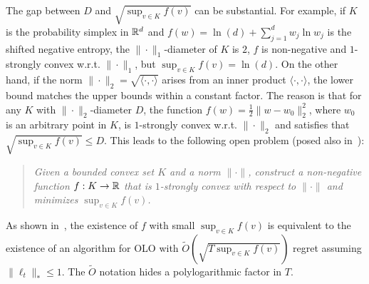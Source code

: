 The gap between $D$ and $\sqrt{\sup_{v \in K} f(v)}$ can be substantial.  For
example, if $K$ is the probability simplex in $\mathbb{R}^d$ and $f(w) = \ln(d) +
\sum_{j=1}^d w_j \ln w_j$ is the shifted negative entropy, the
$\|\cdot\|_1$-diameter of $K$ is $2$, $f$ is non-negative and $1$-strongly
convex w.r.t. $\|\cdot\|_1$, but $\sup_{v \in K} f(v) = \ln(d)$.  On the other
hand, if the norm $\|\cdot\|_2 = \sqrt{\langle \cdot, \cdot \rangle}$ arises
from an inner product $\langle \cdot, \cdot \rangle$, the lower bound matches
the upper bounds within a constant factor.  The reason is that for any $K$ with
$\|\cdot\|_2$-diameter $D$, the function $f(w) = \frac{1}{2} \|w - w_0\|_2^2$,
where $w_0$ is an arbitrary point in $K$, is $1$-strongly convex w.r.t.
$\|\cdot\|_2$ and satisfies that $\sqrt{\sup_{v \in K} f(v)} \le D$. This leads
to the following open problem (posed also in~\cite{Kwon-Mertikopoulos-2014}):
%
\begin{quotation}
\noindent
\emph{Given a bounded convex set $K$ and a norm $\|\cdot\|$, construct a non-negative
function $f:K \to \mathbb{R}$ that is $1$-strongly convex with respect to $\|\cdot\|$
and minimizes $\sup_{v \in K} f(v)$.}
\end{quotation}
%
As shown in~\cite{Srebro-Sridharan-Tewari-2011}, the existence of $f$ with small
$\sup_{v \in K} f(v)$ is equivalent to the existence of an algorithm for OLO with
$\widetilde O(\sqrt{T \sup_{v \in K} f(v)})$ regret assuming $\|\ell_t\|_* \le 1$.
The $\widetilde O$ notation hides a polylogarithmic factor in $T$.
